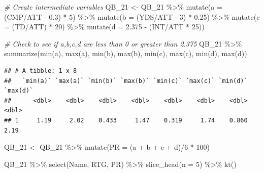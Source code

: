 \documentclass[
  11pt,
]{book}
\newenvironment{Shaded}{\begin{snugshade}}{\end{snugshade}}
\newcommand{\AttributeTok}[1]{\textcolor[rgb]{0.77,0.63,0.00}{#1}}
\newcommand{\CommentTok}[1]{\textcolor[rgb]{0.56,0.35,0.01}{\textit{#1}}}
\newcommand{\DecValTok}[1]{\textcolor[rgb]{0.00,0.00,0.81}{#1}}
\newcommand{\FloatTok}[1]{\textcolor[rgb]{0.00,0.00,0.81}{#1}}
\newcommand{\FunctionTok}[1]{\textcolor[rgb]{0.00,0.00,0.00}{#1}}
\newcommand{\NormalTok}[1]{#1}
\newcommand{\OtherTok}[1]{\textcolor[rgb]{0.56,0.35,0.01}{#1}}
\newcommand{\SpecialCharTok}[1]{\textcolor[rgb]{0.00,0.00,0.00}{#1}}
\theoremstyle{definition}
\theoremstyle{definition}
\theoremstyle{definition}
\theoremstyle{definition}
\theoremstyle{remark}
\begin{document}
\begin{Shaded}
\begin{Highlighting}[]
\CommentTok{\# Create intermediate variables}
\NormalTok{QB\_21 }\OtherTok{\textless{}{-}}\NormalTok{ QB\_21 }\SpecialCharTok{\%\textgreater{}\%}
    \FunctionTok{mutate}\NormalTok{(}\AttributeTok{a =}\NormalTok{ (CMP}\SpecialCharTok{/}\NormalTok{ATT }\SpecialCharTok{{-}} \FloatTok{0.3}\NormalTok{) }\SpecialCharTok{*} \DecValTok{5}\NormalTok{) }\SpecialCharTok{\%\textgreater{}\%}
    \FunctionTok{mutate}\NormalTok{(}\AttributeTok{b =}\NormalTok{ (YDS}\SpecialCharTok{/}\NormalTok{ATT }\SpecialCharTok{{-}} \DecValTok{3}\NormalTok{) }\SpecialCharTok{*} \FloatTok{0.25}\NormalTok{) }\SpecialCharTok{\%\textgreater{}\%}
    \FunctionTok{mutate}\NormalTok{(}\AttributeTok{c =}\NormalTok{ (TD}\SpecialCharTok{/}\NormalTok{ATT) }\SpecialCharTok{*} \DecValTok{20}\NormalTok{) }\SpecialCharTok{\%\textgreater{}\%}
    \FunctionTok{mutate}\NormalTok{(}\AttributeTok{d =} \FloatTok{2.375} \SpecialCharTok{{-}}\NormalTok{ (INT}\SpecialCharTok{/}\NormalTok{ATT }\SpecialCharTok{*} \DecValTok{25}\NormalTok{))}

\CommentTok{\# Check to see if a,b,c,d are less than 0 or greater than 2.375}
\NormalTok{QB\_21 }\SpecialCharTok{\%\textgreater{}\%}
    \FunctionTok{summarize}\NormalTok{(}\FunctionTok{min}\NormalTok{(a), }\FunctionTok{max}\NormalTok{(a), }\FunctionTok{min}\NormalTok{(b), }\FunctionTok{max}\NormalTok{(b), }\FunctionTok{min}\NormalTok{(c), }\FunctionTok{max}\NormalTok{(c), }\FunctionTok{min}\NormalTok{(d), }\FunctionTok{max}\NormalTok{(d))}
\end{Highlighting}
\end{Shaded}

\begin{verbatim}
## # A tibble: 1 x 8
##   `min(a)` `max(a)` `min(b)` `max(b)` `min(c)` `max(c)` `min(d)` `max(d)`
##      <dbl>    <dbl>    <dbl>    <dbl>    <dbl>    <dbl>    <dbl>    <dbl>
## 1     1.19     2.02    0.433     1.47    0.319     1.74    0.860     2.19
\end{verbatim}

\begin{Shaded}
\begin{Highlighting}[]
\NormalTok{QB\_21 }\OtherTok{\textless{}{-}}\NormalTok{ QB\_21 }\SpecialCharTok{\%\textgreater{}\%}
    \FunctionTok{mutate}\NormalTok{(}\AttributeTok{PR =}\NormalTok{ (a }\SpecialCharTok{+}\NormalTok{ b }\SpecialCharTok{+}\NormalTok{ c }\SpecialCharTok{+}\NormalTok{ d)}\SpecialCharTok{/}\DecValTok{6} \SpecialCharTok{*} \DecValTok{100}\NormalTok{)}

\NormalTok{QB\_21 }\SpecialCharTok{\%\textgreater{}\%}
    \FunctionTok{select}\NormalTok{(Name, RTG, PR) }\SpecialCharTok{\%\textgreater{}\%}
    \FunctionTok{slice\_head}\NormalTok{(}\AttributeTok{n =} \DecValTok{5}\NormalTok{) }\SpecialCharTok{\%\textgreater{}\%}
    \FunctionTok{kt}\NormalTok{()}
\end{Highlighting}
\end{Shaded}
\end{document}
